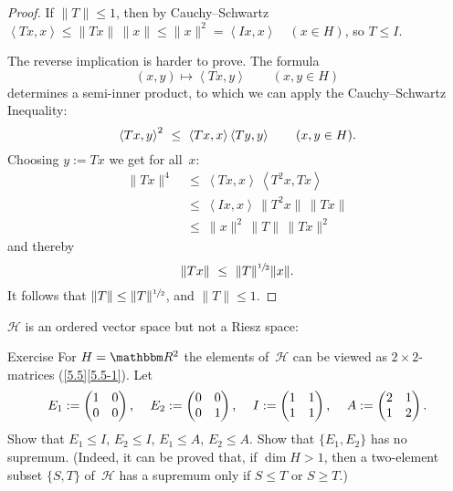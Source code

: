 \documentclass[main.tex]{subfiles}
\begin{document}
\begin{proof}
If $\|T\|\leq 1$,
then by Cauchy--Schwartz 
$\left<Tx,x\right>
\leq \|Tx\|\,\|x\|
\leq\|x\|^2
=\left<Ix,x\right>\quad(x\in H)$,
so $T\leq I$.

The reverse implication is harder to prove.
The formula 
\begin{equation*}
(x,y) \mapsto \left< Tx, y \right>\qquad (x,y\in H)
\end{equation*}
determines a semi-inner product,
to which we can apply the Cauchy--Schwartz Inequality:
\begin{equation*}
\left< Tx, y\right>^2\ \leq\ \left<Tx,x\right>\left<Ty,y\right>
\qquad(x,y\in H)\text{.}
\end{equation*}
Choosing $y:=Tx$ we get for all~$x$:
\begin{align*}
\|Tx\|^4\ &\leq\ \left<Tx, x\right>\,\left< T^2x,Tx\right> \\
          &\leq\ \left<Ix, x\right>\,\|T^2 x\|\,\|Tx\| \\
          &\leq\ \|x\|^2\,\|T\|\,\|Tx\|^2
\end{align*}
and thereby
\begin{equation*}
\|Tx\|\ \leq\ \|T\|^{\sfrac{1}{2}} \|x\|\text{.}
\end{equation*}
It follows that $\|T\|\leq \|T\|^{\sfrac{1}{2}}$,
and $\|T\|\leq 1$. \xqed
\end{proof}
%
%
\noindent$\mathscr H$ is an ordered vector space
but not a Riesz space:
\begin{psec}{5.11}{Exercise}
For $H=\R^2$
the elements of~$\mathscr H$ can be viewed as $2\times 2$-matrices
(\ref{5.5}\ref{5.5-1}).
Let
\begin{equation*}
E_1 := \begin{pmatrix}1&0\\0&0\end{pmatrix}\text{, }\quad
E_2 := \begin{pmatrix}0&0\\0&1\end{pmatrix}\text{, }\quad
I   := \begin{pmatrix}1&1\\1&1\end{pmatrix}\text{, }\quad
A   := \begin{pmatrix}2&1\\1&2\end{pmatrix}\text{.}
\end{equation*}
Show that $E_1\leq I$, $E_2\leq I$, $E_1\leq A$, $E_2\leq A$.
Show that $\{E_1,E_2\}$ has no supremum.
(Indeed,
it can be proved that,
if $\dim H>1$,
then a two-element subset $\{S,T\}$ of~$\mathscr H$
has a supremum only if $S\leq T$
or $S\geq T$.)
\end{psec}
\end{document}
